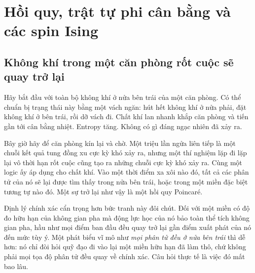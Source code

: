 \chapter{Hồi quy, trật tự phi cân bằng và các spin Ising}


\section{Không khí trong một căn phòng rốt cuộc sẽ quay trở lại}

Hãy bắt đầu với toàn bộ không khí ở nửa bên trái của một căn phòng. Có thể chuẩn bị trạng thái này bằng một vách ngăn: hút hết không khí ở nửa phải, đặt không khí ở bên trái, rồi dỡ vách đi. Chất khí lan nhanh khắp căn phòng và tiến gần tới cân bằng nhiệt. Entropy tăng. Không có gì đáng ngạc nhiên đã xảy ra.

Bây giờ hãy để căn phòng kín lại và chờ. Một triệu lần ngửa liên tiếp là một chuỗi kết quả tung đồng xu cực kỳ khó xảy ra, nhưng một thí nghiệm lặp đi lặp lại vô thời hạn rốt cuộc cũng tạo ra những chuỗi cực kỳ khó xảy ra. Cùng một logic ấy áp dụng cho chất khí. Vào một thời điểm xa xôi nào đó, tất cả các phân tử của nó sẽ lại được tìm thấy trong nửa bên trái, hoặc trong một miền đặc biệt tương tự nào đó. Một sự trở lại như vậy là một hồi quy Poincaré.

Định lý chính xác cẩn trọng hơn bức tranh này đôi chút. Đối với một miền có độ đo hữu hạn của không gian pha mà động lực học của nó bảo toàn thể tích không gian pha, hầu như mọi điểm ban đầu đều quay trở lại gần điểm xuất phát của nó đến mức tùy ý. Một phát biểu vĩ mô như \emph{mọi phân tử đều ở nửa bên trái} thì dễ hơn: nó chỉ đòi hỏi quỹ đạo đi vào lại một miền hữu hạn đã làm thô, chứ không phải mọi tọa độ phân tử đều quay về chính xác. Câu hỏi thực tế là việc đó mất bao lâu.


